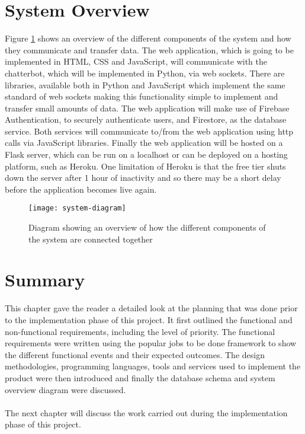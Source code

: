 \section{System Overview}
Figure \ref{fig:system-diagram} shows an overview of the different components of the system and how they communicate and transfer data. The web application, which is going to be implemented in HTML, CSS and JavaScript, will communicate with the chatterbot, which will be implemented in Python, via web sockets. There are libraries, available both in Python and JavaScript which implement the same standard of web sockets making this functionality simple to implement and transfer small amounts of data. The web application will make use of Firebase Authentication, to securely authenticate users, and Firestore, as the database service. Both services will communicate to/from the web application using http calls via JavaScript libraries. Finally the web application will be hosted on a Flask server, which can be run on a localhost or can be deployed on a hosting platform, such as Heroku. One limitation of Heroku is that the free tier shuts down the server after 1 hour of inactivity and so there may be a short delay before the application becomes live again. \\
\begin{figure}[h]
	\centering
	\texttt{[image: system-diagram]}
	\caption{Diagram showing an overview of how the different components of the system are connected together}
	\label{fig:system-diagram}
\end{figure}
\section{Summary}
This chapter gave the reader a detailed look at the planning that was done prior to the implementation phase of this project. It first outlined the functional and non-functional requirements, including the level of priority. The functional requirements were written using the popular jobs to be done framework to show the different functional events and their expected outcomes. The design methodologies, programming languages, tools and services used to implement the product were then introduced and finally the database schema and system overview diagram were discussed. \\\\
The next chapter will discuss the work carried out during the implementation phase of this project.
